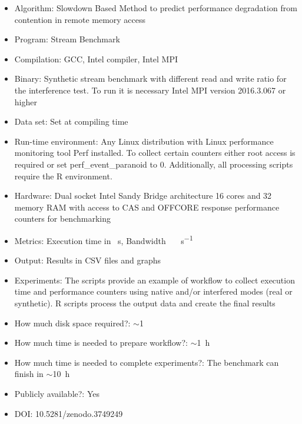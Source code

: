 \documentclass{sigplanconf}
\begin{document}
	\begin{itemize} 
		
		\item Algorithm: Slowdown Based Method to predict performance degradation from
		contention in remote memory access
		
		\item Program: Stream Benchmark
		
		\item Compilation: GCC, Intel compiler, Intel MPI 
		
		\item Binary: Synthetic stream benchmark with different read and write ratio for the
		interference test. To run it is necessary Intel MPI version 2016.3.067 or higher 
		
		\item Data set: Set at compiling time 
		
		\item Run-time environment: Any Linux distribution with Linux performance monitoring
		tool \textsf{Perf} installed. To collect certain counters either root access is
		required or set \textsf{perf\_event\_paranoid} to 0. Additionally, all processing
		scripts require the R environment.  
		
		\item Hardware: Dual socket Intel Sandy Bridge architecture 16 cores and
		\SI{32}{\giga\byte} memory RAM with access to CAS and OFFCORE response performance
		counters for benchmarking
		
		\item Metrics: Execution time in \SI{}{\second}, Bandwidth
		\SI{}{\giga\byte\per\second}
		
		\item Output: Results in CSV files and graphs 
		
		\item Experiments: The scripts provide an example of workflow to collect execution
		time and performance counters using native and/or interfered modes (real or
		synthetic). R scripts process the output data and create the final results 
		
		\item How much disk space required?: $\sim$\SI{1}{\giga\byte} 
		
		\item How much time is needed to prepare workflow?: $\sim$\SI{1}{\hour}
		
		\item How much time is needed to complete experiments?: The benchmark can finish in
		$\sim$\SI{10}{\hour}
		
		\item Publicly available?: Yes
		
		\item DOI: 10.5281/zenodo.3749249
		
	\end{itemize}
	
\end{document}

